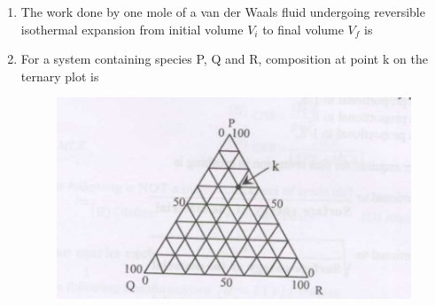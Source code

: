 \documentclass[journal,12pt,onecolumn]{IEEEtran}
\theoremstyle{remark}
\begin{document}
\begin{enumerate}
\item The work done by one mole of a van der Waals fluid undergoing reversible isothermal expansion from initial volume $V_i$ to final volume $V_f$ is
\hfill{}
    \begin{enumerate}[label=(\Alph*)]
    \end{enumerate}

\item For a system containing species P, Q and R, composition at point k on the ternary plot is
    \begin{figure}[H]
    \centering
    \includegraphics[width=0.25\columnwidth]{figs/qn8.jpg}
    \caption{}
    \label{fig:qn8.jpg}
    \end{figure}
    \hfill{}
    \begin{enumerate}[label=(\Alph*)]
    \end{enumerate}


\end{enumerate}
\end{document}
